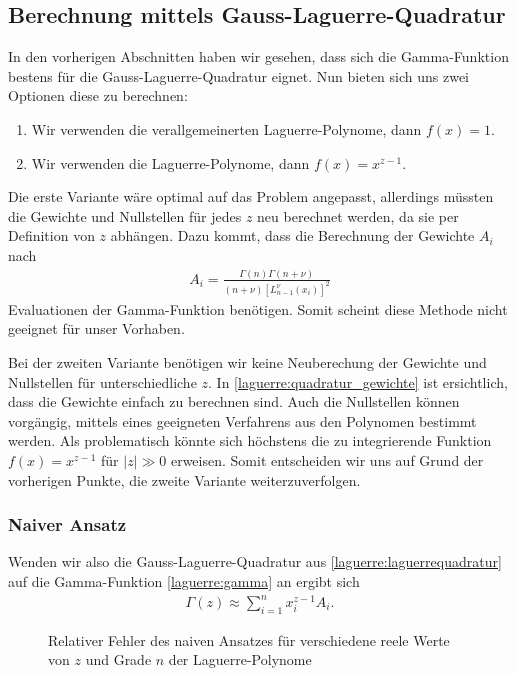 \subsection{Berechnung mittels Gauss-Laguerre-Quadratur}
In den vorherigen Abschnitten haben wir gesehen,
dass sich die Gamma-Funktion bestens für die Gauss-Laguerre-Quadratur eignet.
Nun bieten sich uns zwei Optionen diese zu berechnen:
\begin{enumerate}
\item Wir verwenden die verallgemeinerten Laguerre-Polynome, dann $f(x)=1$.
\item Wir verwenden die Laguerre-Polynome, dann $f(x)=x^{z-1}$.
\end{enumerate}
Die erste Variante wäre optimal auf das Problem angepasst,
allerdings müssten die Gewichte und Nullstellen für jedes $z$
neu berechnet werden,
da sie per Definition von $z$ abhängen.
Dazu kommt,
dass die Berechnung der Gewichte $A_i$ nach \cite{Cassity1965AbcissasCA}
\begin{align*}
A_i
=
\frac{
\Gamma(n) \Gamma(n+\nu)
}
{
(n+\nu)
\left[L_{n-1}^{\nu}(x_i)\right]^2
}
\end{align*}
Evaluationen der Gamma-Funktion benötigen.
Somit scheint diese Methode nicht geeignet für unser Vorhaben.

Bei der zweiten Variante benötigen wir keine Neuberechung der Gewichte
und Nullstellen für unterschiedliche $z$.
In \eqref{laguerre:quadratur_gewichte} ist ersichtlich,
dass die Gewichte einfach zu berechnen sind.
Auch die Nullstellen können vorgängig,
mittels eines geeigneten Verfahrens aus den Polynomen bestimmt werden.
Als problematisch könnte sich höchstens
die zu integrierende Funktion $f(x)=x^{z-1}$ für $|z| \gg 0$ erweisen.
Somit entscheiden wir uns auf Grund der vorherigen Punkte,
die zweite Variante weiterzuverfolgen.

\subsubsection{Naiver Ansatz}
Wenden wir also die Gauss-Laguerre-Quadratur aus
\eqref{laguerre:laguerrequadratur} auf die Gamma-Funktion
\eqref{laguerre:gamma} an ergibt sich
\begin{align}
\Gamma(z)
\approx
\sum_{i=1}^n x_i^{z-1} A_i.
\label{laguerre:naive_lag}
\end{align}

\begin{figure}
\centering

\vspace{-12pt}
\caption{Relativer Fehler des naiven Ansatzes
für verschiedene reele Werte von $z$ und Grade $n$ der Laguerre-Polynome}
\label{laguerre:fig:rel_error_simple}
\end{figure}

